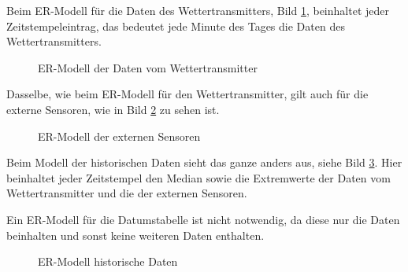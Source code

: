 Beim ER-Modell für die Daten des Wettertransmitters, Bild \ref{img:ER_Modell Wettertransmitter},  beinhaltet jeder Zeitstempeleintrag, das bedeutet jede Minute des Tages die Daten des Wettertransmitters.

\begin{figure}[h!]
	\centering
	\caption{ER-Modell der Daten vom Wettertransmitter}
	\label{img:ER_Modell Wettertransmitter}
\end{figure}

Dasselbe, wie beim ER-Modell für den Wettertransmitter, gilt auch für die externe Sensoren, wie in Bild \ref{img:ER_Modell externe Sensoren} zu sehen ist.
\begin{figure}[h!]
	\centering
	\caption{ER-Modell der externen Sensoren}
	\label{img:ER_Modell externe Sensoren}
\end{figure}

Beim Modell der historischen Daten sieht das ganze anders aus, siehe Bild \ref{img:ER_Modell historische Daten}. Hier beinhaltet jeder Zeitstempel den Median sowie die Extremwerte der Daten vom Wettertransmitter und die der externen Sensoren.

Ein ER-Modell für die Datumstabelle ist nicht notwendig, da diese nur die Daten beinhalten und sonst keine weiteren Daten enthalten.

\begin{figure}[h!]
	\centering
	\caption{ER-Modell historische Daten}
	\label{img:ER_Modell historische Daten}
\end{figure}

